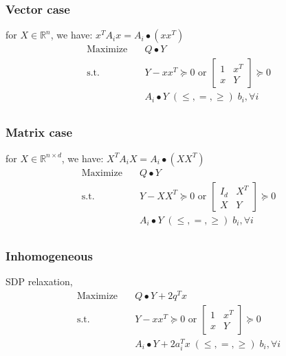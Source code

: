 \documentclass[../main]{subfiles}
\begin{document}
\subsubsection{Vector case}
for \(X \in \mathbb{R}^{n}\), we have: \(x^{T} A_{i} x = A_i \bullet (xx^T)\)
\begin{equation}
    \begin{aligned}
        \mathrm{Maximize}\quad & Q\bullet Y                                                        \\
        \mathrm{s.t.}  \quad   & Y-xx^T \succeq 0 \text { or } \begin{bmatrix} 1 & x^{T} \\ x & Y \end{bmatrix} \succeq 0 \\
                               & A_i \bullet Y \; (\le, =, \ge) \; b_i, \forall i                  \\
    \end{aligned}
\end{equation}

\subsubsection{Matrix case}
for \(X \in \mathbb{R}^{n\times d}\), we have: \(X^{T} A_{i} X = A_i \bullet (XX^T)\)
\begin{equation}
    \begin{aligned}
        \mathrm{Maximize}\quad & Q\bullet Y                                                       \\
        \mathrm{s.t.}  \quad   & Y-XX^T \succeq 0 \text { or }\begin{bmatrix} I_d & X^{T} \\ X & Y \end{bmatrix} \succeq 0 \\
                               & A_i \bullet Y \; (\le, =, \ge) \; b_i, \forall i                 \\
    \end{aligned}
\end{equation}

\subsubsection{Inhomogeneous}
SDP relaxation,
\begin{equation}
    \begin{aligned}
        \mathrm{Maximize}\quad & Q\bullet Y   + 2q^T x                                            \\
        \mathrm{s.t.}  \quad   & Y-xx^T \succeq 0 \text { or }\begin{bmatrix} 1 & x^{T} \\ x & Y \end{bmatrix} \succeq 0 \\
                               & A_i \bullet Y +2 a_i^Tx \; (\le, =, \ge) \; b_i, \forall i       \\
    \end{aligned}
\end{equation}
\end{document}

